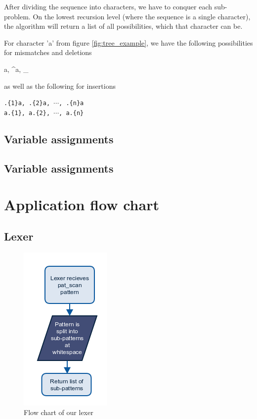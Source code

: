 \documentclass[12pt]{article}
\begin{document}
After dividing the sequence into characters, we have to conquer each sub-problem. On the lowest recursion level (where the sequence is a single character), the algorithm will return a list of all possibilities, which that character can be.

For character 'a' from figure \ref{fig:tree_example}, we have the following possibilities for mismatches and deletions

\begin{center}
	{a, \^{}a, \_}
\end{center}

as well as the following for insertions

\begin{center}
	\texttt{.\{1\}a, .\{2\}a, $\cdots$, .\{n\}a} \\
	\texttt{a.\{1\}, a.\{2\}, $\cdots$, a.\{n\}}
\end{center}


\subsection{Variable assignments}


\subsection{Variable assignments}


\section{Application flow chart}

\subsection{Lexer}
\begin{figure}[H]
	\begin{center}
		\includegraphics[scale=1]{lexer.png}
	\end{center}
	\caption{Flow chart of our lexer}
\end{figure}
\end{document}
